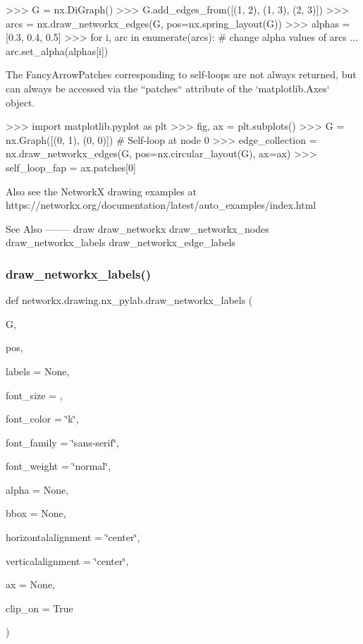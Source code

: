 \begin{DoxyVerb}
>>> G = nx.DiGraph()
>>> G.add_edges_from([(1, 2), (1, 3), (2, 3)])
>>> arcs = nx.draw_networkx_edges(G, pos=nx.spring_layout(G))
>>> alphas = [0.3, 0.4, 0.5]
>>> for i, arc in enumerate(arcs):  # change alpha values of arcs
...     arc.set_alpha(alphas[i])

The FancyArrowPatches corresponding to self-loops are not always
returned, but can always be accessed via the ``patches`` attribute of the
`matplotlib.Axes` object.

>>> import matplotlib.pyplot as plt
>>> fig, ax = plt.subplots()
>>> G = nx.Graph([(0, 1), (0, 0)])  # Self-loop at node 0
>>> edge_collection = nx.draw_networkx_edges(G, pos=nx.circular_layout(G), ax=ax)
>>> self_loop_fap = ax.patches[0]

Also see the NetworkX drawing examples at
https://networkx.org/documentation/latest/auto_examples/index.html

See Also
--------
draw
draw_networkx
draw_networkx_nodes
draw_networkx_labels
draw_networkx_edge_labels\end{DoxyVerb}
 \mbox{\label{namespacenetworkx_1_1drawing_1_1nx__pylab_a36145e7e2e1717b10a72c53e4d2dc582}} 
\subsubsection{\texorpdfstring{draw\+\_\+networkx\+\_\+labels()}{draw\_networkx\_labels()}}
{\footnotesize\ttfamily def networkx.\+drawing.\+nx\+\_\+pylab.\+draw\+\_\+networkx\+\_\+labels (\begin{DoxyParamCaption}\item[{}]{G,  }\item[{}]{pos,  }\item[{}]{labels = {\ttfamily None},  }\item[{}]{font\+\_\+size = {},  }\item[{}]{font\+\_\+color = {\ttfamily \char`\"{}k\char`\"{}},  }\item[{}]{font\+\_\+family = {\ttfamily \char`\"{}sans-\/serif\char`\"{}},  }\item[{}]{font\+\_\+weight = {\ttfamily \char`\"{}normal\char`\"{}},  }\item[{}]{alpha = {\ttfamily None},  }\item[{}]{bbox = {\ttfamily None},  }\item[{}]{horizontalalignment = {\ttfamily \char`\"{}center\char`\"{}},  }\item[{}]{verticalalignment = {\ttfamily \char`\"{}center\char`\"{}},  }\item[{}]{ax = {\ttfamily None},  }\item[{}]{clip\+\_\+on = {\ttfamily True} }\end{DoxyParamCaption})}

